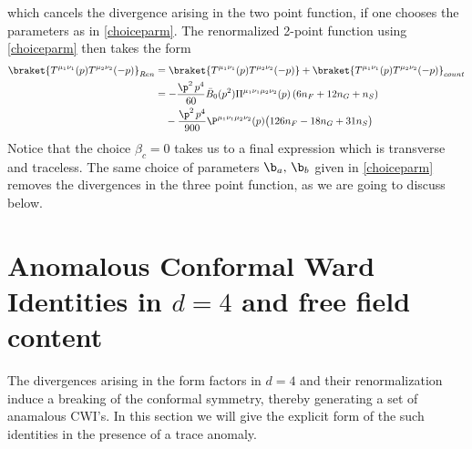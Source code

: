 \documentclass[a4paper,11pt,openright,twoside]{book}
\numberwithin{equation}{section}
\begin{document}
{{which cancels the divergence arising in the two point function, if one chooses the parameters as in \eqref{choiceparm}.  
The renormalized 2-point function using  \eqref{choiceparm} then takes the form  \begin{align}
	\braket{T^{\mu_1\nu_1}(p)T^{\mu_2\nu_2}(-p)}_{Ren}&=\braket{T^{\mu_1\nu_1}(p)T^{\mu_2\nu_2}(-p)}+\braket{T^{\mu_1\nu_1}(p)T^{\mu_2\nu_2}(-p)}_{count}\notag\\
	&=-\frac{\p^2\,p^4}{60}\bar{B}_0(p^2)\Pi^{\mu_1\nu_1\mu_2\nu_2}(p)\left(6n_F+12n_G+n_S\right)\notag\\
	&\quad-\frac{\p^2\,p^4}{900}\P^{\mu_1\nu_1\mu_2\nu_2}(p)\big(126n_F-18n_G+31n_S\big)
	\label{tren}
\end{align}
Notice that the choice $\beta_c=0$ takes us to 
a final expression which is transverse and traceless. 
The same choice of parameters $\b_a,\,\b_b$ given in \eqref{choiceparm} removes the divergences in the three point function, as we are going to discuss below. 


\section{Anomalous Conformal Ward Identities in $d=4$ and free field content}
The divergences arising in the form factors in $d=4$ and their renormalization induce a breaking of the conformal symmetry, thereby generating a set of anamalous CWI's.  In this section we will give the explicit form of the such identities in the presence of a trace anomaly.

}}
\end{document}
